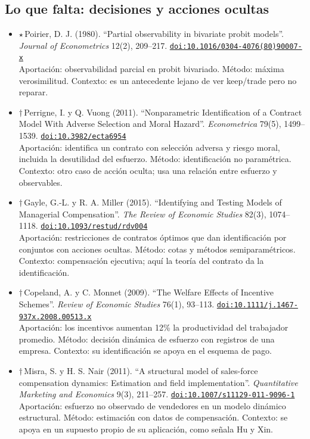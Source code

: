 \documentclass[11pt]{article}
\begin{document}
\subsection*{Lo que falta: decisiones y acciones ocultas}
\begin{itemize}
\item $\star$\,Poirier, D. J. (1980). ``Partial observability in bivariate probit models''. \textit{Journal of Econometrics} 12(2), 209--217. \href{https://doi.org/10.1016/0304-4076(80)90007-x}{\texttt{doi:10.1016/0304-4076(80)90007-x}}\\
Aportación: observabilidad parcial en probit bivariado. Método: máxima verosimilitud. Contexto: es un antecedente lejano de ver keep/trade pero no reparar.
\item $\dagger$\,Perrigne, I. y Q. Vuong (2011). ``Nonparametric Identification of a Contract Model With Adverse Selection and Moral Hazard''. \textit{Econometrica} 79(5), 1499--1539. \href{https://doi.org/10.3982/ecta6954}{\texttt{doi:10.3982/ecta6954}}\\
Aportación: identifica un contrato con selección adversa y riesgo moral, incluida la desutilidad del esfuerzo. Método: identificación no paramétrica. Contexto: otro caso de acción oculta; usa una relación entre esfuerzo y observables.
\item $\dagger$\,Gayle, G.-L. y R. A. Miller (2015). ``Identifying and Testing Models of Managerial Compensation''. \textit{The Review of Economic Studies} 82(3), 1074--1118. \href{https://doi.org/10.1093/restud/rdv004}{\texttt{doi:10.1093/restud/rdv004}}\\
Aportación: restricciones de contratos óptimos que dan identificación por conjuntos con acciones ocultas. Método: cotas y métodos semiparamétricos. Contexto: compensación ejecutiva; aquí la teoría del contrato da la identificación.
\item $\dagger$\,Copeland, A. y C. Monnet (2009). ``The Welfare Effects of Incentive Schemes''. \textit{Review of Economic Studies} 76(1), 93--113. \href{https://doi.org/10.1111/j.1467-937x.2008.00513.x}{\texttt{doi:10.1111/j.1467-937x.2008.00513.x}}\\
Aportación: los incentivos aumentan 12\% la productividad del trabajador promedio. Método: decisión dinámica de esfuerzo con registros de una empresa. Contexto: su identificación se apoya en el esquema de pago.
\item $\dagger$\,Misra, S. y H. S. Nair (2011). ``A structural model of sales-force compensation dynamics: Estimation and field implementation''. \textit{Quantitative Marketing and Economics} 9(3), 211--257. \href{https://doi.org/10.1007/s11129-011-9096-1}{\texttt{doi:10.1007/s11129-011-9096-1}}\\
Aportación: esfuerzo no observado de vendedores en un modelo dinámico estructural. Método: estimación con datos de compensación. Contexto: se apoya en un supuesto propio de su aplicación, como señala Hu y Xin.
\end{itemize}
\end{document}

